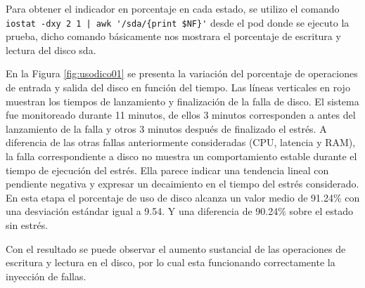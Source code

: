\par Para obtener el indicador en porcentaje en cada estado, se utilizo el comando \\ \verb+iostat -dxy 2 1 | awk '/sda/{print $NF}'+ desde el pod donde se ejecuto la prueba, dicho comando básicamente nos mostrara el porcentaje de escritura y lectura del disco sda.\\



\par En la Figura \ref{fig:usodico01} se presenta la variación del porcentaje de operaciones de entrada y salida del disco en función del tiempo. Las líneas verticales en rojo muestran los tiempos de lanzamiento y finalización de la falla de disco. El sistema fue monitoreado durante 11 minutos, de ellos 3 minutos corresponden a antes del lanzamiento de la falla y otros 3 minutos después de finalizado el estrés. A diferencia de las otras fallas anteriormente consideradas (CPU, latencia y RAM), la falla correspondiente a disco no muestra un comportamiento estable durante el tiempo de ejecución del estrés. Ella parece indicar una tendencia lineal con pendiente negativa y expresar un decaimiento en el tiempo del estrés considerado. En esta etapa el porcentaje de uso de disco alcanza un valor medio de 91.24\% con una desviación estándar igual a 9.54. Y una diferencia de 90.24\% sobre el estado sin estrés.\\


\par Con el resultado se puede observar el aumento sustancial de las operaciones de escritura y lectura en el disco, por lo cual esta funcionando correctamente la inyección de fallas.\\

